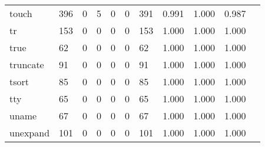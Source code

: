 \begin{longtable}{lp{1.10cm}p{1.10cm}p{1.10cm}p{1.10cm}p{1.10cm}p{1.10cm}p{1.10cm}p{1.10cm}p{1.10cm}p{1.10cm}}
touch     &                    396 &                                  0 &                                 5 &                                0 &                                 0 &                             391 &                          0.991 &                                 1.000 &                               0.987 \\
tr        &                    153 &                                  0 &                                 0 &                                0 &                                 0 &                             153 &                          1.000 &                                 1.000 &                               1.000 \\
true      &                     62 &                                  0 &                                 0 &                                0 &                                 0 &                              62 &                          1.000 &                                 1.000 &                               1.000 \\
truncate  &                     91 &                                  0 &                                 0 &                                0 &                                 0 &                              91 &                          1.000 &                                 1.000 &                               1.000 \\
tsort     &                     85 &                                  0 &                                 0 &                                0 &                                 0 &                              85 &                          1.000 &                                 1.000 &                               1.000 \\
tty       &                     65 &                                  0 &                                 0 &                                0 &                                 0 &                              65 &                          1.000 &                                 1.000 &                               1.000 \\
uname     &                     67 &                                  0 &                                 0 &                                0 &                                 0 &                              67 &                          1.000 &                                 1.000 &                               1.000 \\
unexpand  &                    101 &                                  0 &                                 0 &                                0 &                                 0 &                             101 &                          1.000 &                                 1.000 &                               1.000 \\

\end{longtable}
